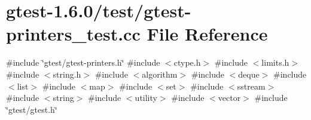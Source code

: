 \hypertarget{gtest-printers__test_8cc}{\section{gtest-\/1.6.0/test/gtest-\/printers\-\_\-test.cc \-File \-Reference}
\label{d9/dc3/gtest-printers__test_8cc}
}
{\ttfamily \#include \char`\"{}gtest/gtest-\/printers.\-h\char`\"{}}\*
{\ttfamily \#include $<$ctype.\-h$>$}\*
{\ttfamily \#include $<$limits.\-h$>$}\*
{\ttfamily \#include $<$string.\-h$>$}\*
{\ttfamily \#include $<$algorithm$>$}\*
{\ttfamily \#include $<$deque$>$}\*
{\ttfamily \#include $<$list$>$}\*
{\ttfamily \#include $<$map$>$}\*
{\ttfamily \#include $<$set$>$}\*
{\ttfamily \#include $<$sstream$>$}\*
{\ttfamily \#include $<$string$>$}\*
{\ttfamily \#include $<$utility$>$}\*
{\ttfamily \#include $<$vector$>$}\*
{\ttfamily \#include \char`\"{}gtest/gtest.\-h\char`\"{}}\*
